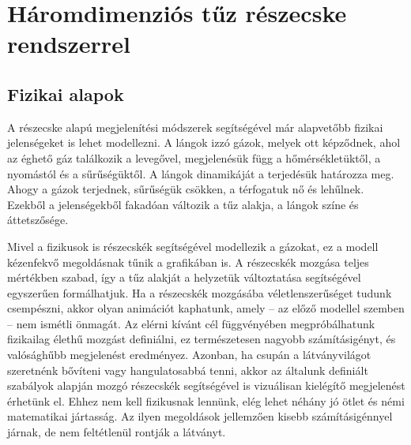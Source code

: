 






\section{Háromdimenziós tűz részecske rendszerrel}

\subsection{Fizikai alapok}
A részecske alapú megjelenítési módszerek segítségével már alapvetőbb fizikai jelenségeket is lehet modellezni. A lángok izzó gázok, melyek ott képződnek, ahol az éghető gáz találkozik a levegővel, megjelenésük függ a hőmérsékletüktől, a nyomástól és a sűrűségüktől. A lángok dinamikáját a terjedésük határozza meg. Ahogy a gázok terjednek, sűrűségük csökken, a térfogatuk nő és lehűlnek. Ezekből a jelenségekből fakadóan változik a tűz alakja, a lángok színe és áttetszősége. 

Mivel a fizikusok is részecskék segítségével modellezik a gázokat, ez a modell kézenfekvő megoldásnak tűnik a grafikában is. A részecskék mozgása teljes mértékben szabad, így a tűz alakját a helyzetük változtatása segítségével egyszerűen formálhatjuk. Ha a részecskék mozgásába véletlenszerűséget tudunk csempészni, akkor olyan animációt kaphatunk, amely -- az előző modellel szemben --  nem ismétli önmagát. Az elérni kívánt cél függvényében megpróbálhatunk fizikailag élethű mozgást definiálni, ez természetesen nagyobb számításigényt, és valósághűbb megjelenést eredményez. Azonban, ha csupán a látványvilágot szeretnénk bővíteni vagy hangulatosabbá tenni, akkor az általunk definiált szabályok alapján mozgó részecskék segítségével is vizuálisan kielégítő megjelenést érhetünk el. Ehhez nem kell fizikusnak lennünk, elég lehet néhány jó ötlet és némi matematikai jártasság. Az ilyen megoldások jellemzően kisebb számításigénnyel járnak, de nem feltétlenül rontják a látványt. 

